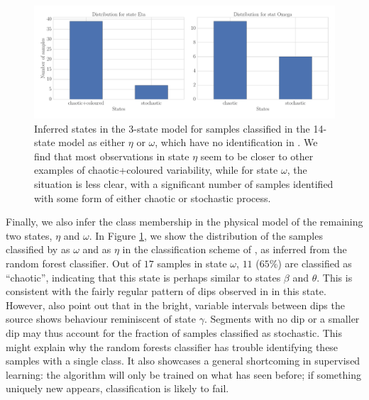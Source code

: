 \documentclass[fleqn,usenatbib]{mnras}
\begin{document}
\begin{figure}
\begin{center}
\includegraphics[width=\textwidth]{grs1915_supervised_eta_omega.pdf}
\caption{Inferred states in the 3-state model for samples classified in the 14-state model as either $\eta$ or $\omega$, which have no identification in \citet{harikrishnan2011}.
We find that most observations in state $\eta$ seem to be closer to other examples of chaotic+coloured variability, while for state $\omega$, the situation is less clear, with a significant 
number of samples identified with some form of either chaotic or stochastic process.} 
\label{fig:etaomega_states}
\end{center}
\end{figure}

Finally, we also infer the class membership in the physical model of the remaining two states, $\eta$ and $\omega$. 
In Figure \ref{fig:etaomega_states}, we show the distribution of the samples classified by \citet{kleinwolt2002} as $\omega$ and \citet{hannikainen2003} as $\eta$ 
in the classification scheme of \citet{harikrishnan2011}, as inferred from the random forest classifier.
Out of $17$ samples in state $\omega$, $11$  ($65\%$) are classified as ``chaotic'', indicating that this state is perhaps similar to states $\beta$ and $\theta$. This is consistent with the fairly regular pattern of dips observed in \citet{kleinwolt2002} in this state. However, \citet{kleinwolt2002} also point out that in the bright, variable intervals between dips the source shows behaviour reminiscent of state $\gamma$. Segments with no dip or a smaller dip may thus account for the fraction of samples classified as stochastic. This might explain why the random forests classifier has trouble identifying these samples with a single class. It also showcases a general shortcoming in supervised learning: the algorithm will only be trained on what has seen before; if something uniquely new appears, classification is likely to fail.
\end{document}
